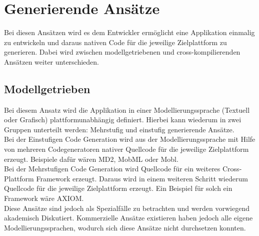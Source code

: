 \newpage
\section{Generierende Ansätze}

Bei diesen Ansätzen wird es dem Entwickler ermöglicht eine Applikation einmalig zu entwickeln und daraus nativen Code für die jeweilige Zielplattform zu generieren.
Dabei wird zwischen modellgetriebenen und cross-kompilierenden Ansätzen weiter unterschieden.

\subsection{Modellgetrieben}

Bei diesem Ansatz wird die Applikation in einer Modellierungssprache (Textuell oder Grafisch) plattformunabhängig definiert.
Hierbei kann wiederum in zwei Gruppen unterteilt werden: Mehrstufig und einstufig generierende Ansätze. \\

Bei der Einstufigen Code Generation wird aus der Modellierungssprache mit Hilfe von mehreren Codegeneratoren nativer Quellcode für die jeweilige Zielplattform erzeugt. Beispiele dafür wären MD2, MobML oder Mobl.\\

Bei der Mehrstufigen Code Generation wird Quellcode für ein weiteres Cross-Plattform Framework erzeugt. Daraus wird in einem weiteren Schritt wiederum Quellcode für die jeweilige Zielplattform erzeugt. Ein Beispiel für solch ein Framework wäre AXIOM.\\

Diese Ansätze sind jedoch als Spezialfälle zu betrachten und werden vorwiegend akademisch Diskutiert. Kommerzielle Ansätze existieren haben jedoch alle eigene Modellierungssprachen, wodurch sich diese Ansätze nicht durchsetzen konnten\cite{umuhoza_modell}\cite{hansen_performance_overhead_cross_platform}.\\

